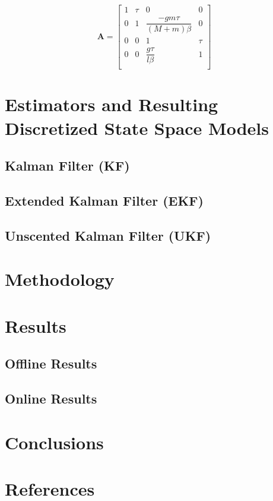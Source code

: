 \documentclass{article}
\newcommand{\matr}[1]{\bm{#1}}     %
\begin{document}
\begin{equation}
\matr{A} = 
\begin{bmatrix}
	1 & \tau & 0 & 0 \\
	0 & 1 & \dfrac{-gm\tau}{(M+m)\beta} & 0 \\
	0 & 0 & 1 & \tau \\
	0 & 0 & \dfrac{g\tau}{l\beta} & 1 \\
\end{bmatrix}
\label{aMatrix}
\end{equation}

\section{Estimators and Resulting Discretized State Space Models}
\subsection{Kalman Filter (KF)}
\subsection{Extended Kalman Filter (EKF)}
\subsection{Unscented Kalman Filter (UKF)}

\section{Methodology}

\section{Results}
\subsection{Offline Results}
\subsection{Online Results}

\section{Conclusions}

\section{References}
\end{document}
